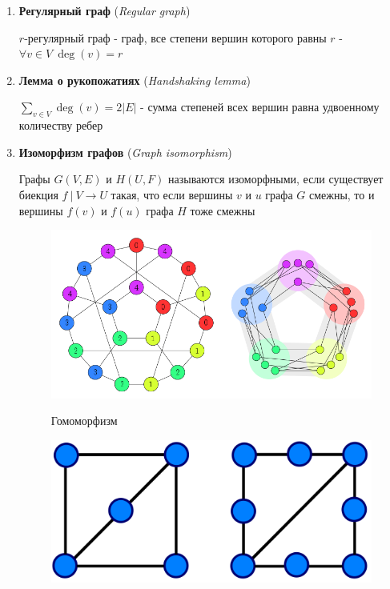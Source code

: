 \documentclass[12pt]{article}
\begin{document}
\begin{enumerate}
        \item \textbf{Регулярный граф} (\textit{Regular graph})

        $r$-регулярный граф - граф, все степени вершин которого равны $r$ - $\forall v \in V \ \deg(v) = r$

        \item \textbf{Лемма о рукопожатиях} (\textit{Handshaking lemma})

        $\sum_{v \in V} \deg(v) = 2|E|$ - сумма степеней всех вершин равна удвоенному количеству ребер

        \item \textbf{Изоморфизм графов} (\textit{Graph isomorphism})

        Графы $G(V, E)$ и $H(U, F)$ называются изоморфными, если существует биекция $f \ | \ V \to U$ такая, что
        если вершины $v$ и $u$ графа $G$ смежны, то и вершины $f(v)$ и $f(u)$ графа $H$ тоже смежны

        \begin{minipage}{\linewidth}
            \begin{figure}
                \begin{center}
                    \includegraphics[width=\linewidth]{dismath/images/dismath_exam_list_graph_homomorphism}

                    Гомоморфизм

                    \smallvspace

                    \includegraphics[width=\linewidth]{dismath/images/dismath_exam_list_graph_homeomorphism}


\end{center}
\end{figure}
\end{minipage}
\end{enumerate}
\end{document}
